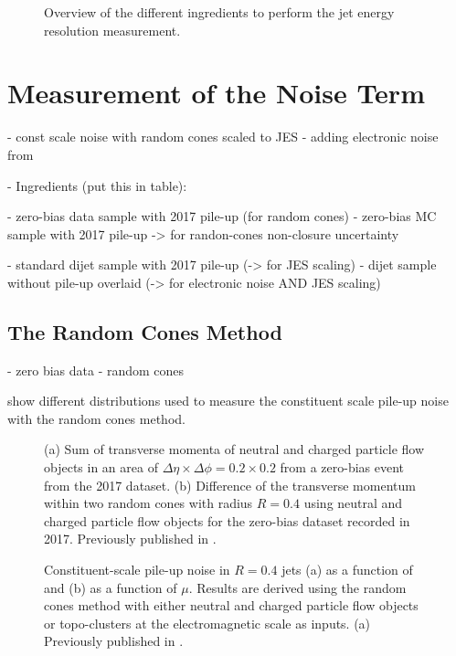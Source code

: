 \begin{figure}
    \caption{Overview of the different ingredients to perform the jet energy resolution measurement.}
    \label{fig:flow-chart-jer}
\end{figure}


\section{Measurement of the Noise Term}

- const scale noise with random cones scaled to JES
- adding electronic noise from

- Ingredients (put this in table):

- zero-bias data sample with 2017 pile-up (for random cones)
- zero-bias MC sample with 2017 pile-up -> for randon-cones non-closure uncertainty

- standard dijet sample with 2017 pile-up (-> for JES scaling)
- dijet sample without pile-up overlaid  (-> for electronic noise AND JES scaling)





\subsection{The Random Cones Method}

- zero bias data
- random cones

 show different distributions used to measure the constituent scale pile-up noise with the random cones method.

\begin{figure}
    \caption{(a) Sum of transverse momenta of neutral and charged particle flow objects in an area of $\Delta \eta \times \Delta \phi = 0.2 \times 0.2$ from a zero-bias event from the 2017 dataset. (b) Difference of the transverse momentum within two random cones with radius $R = 0.4$ using neutral and charged particle flow objects for the zero-bias dataset recorded in 2017.
        Previously published in .}
    \label{fig:random-cones-balance}
\end{figure}

\begin{figure}
    \caption{Constituent-scale pile-up noise in \antikt $R=0.4$ jets (a) as a function of \absetadet and (b) as a function of $\mu$. Results are derived using the random cones method with either neutral and charged particle flow objects or topo-clusters at the electromagnetic scale as inputs. (a)
        Previously published in .}
    \label{fig:const-scale-noise-results}
\end{figure}




